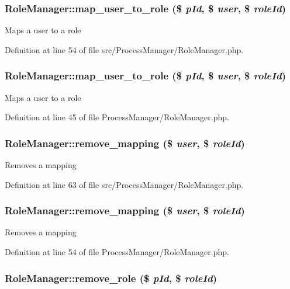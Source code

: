\subsubsection{\setlength{\rightskip}{0pt plus 5cm}Role\-Manager::map\_\-user\_\-to\_\-role (\$ {\em p\-Id}, \$ {\em user}, \$ {\em role\-Id})}\label{classRoleManager_a11}


Maps a user to a role 

Definition at line 54 of file src/Process\-Manager/Role\-Manager.php.
\subsubsection{\setlength{\rightskip}{0pt plus 5cm}Role\-Manager::map\_\-user\_\-to\_\-role (\$ {\em p\-Id}, \$ {\em user}, \$ {\em role\-Id})}\label{classRoleManager_a2}


Maps a user to a role 

Definition at line 45 of file Process\-Manager/Role\-Manager.php.
\subsubsection{\setlength{\rightskip}{0pt plus 5cm}Role\-Manager::remove\_\-mapping (\$ {\em user}, \$ {\em role\-Id})}\label{classRoleManager_a12}


Removes a mapping 

Definition at line 63 of file src/Process\-Manager/Role\-Manager.php.
\subsubsection{\setlength{\rightskip}{0pt plus 5cm}Role\-Manager::remove\_\-mapping (\$ {\em user}, \$ {\em role\-Id})}\label{classRoleManager_a3}


Removes a mapping 

Definition at line 54 of file Process\-Manager/Role\-Manager.php.
\subsubsection{\setlength{\rightskip}{0pt plus 5cm}Role\-Manager::remove\_\-role (\$ {\em p\-Id}, \$ {\em role\-Id})}\label{classRoleManager_a15}


